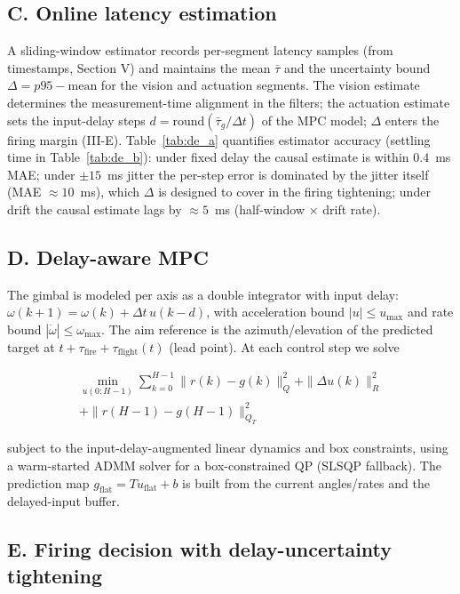 \documentclass[journal]{IEEEtran}
\begin{document}
\subsection*{C. Online latency estimation}

A sliding-window estimator records per-segment latency samples (from timestamps, Section V) and maintains the mean $\bar\tau$ and the uncertainty bound $\Delta = p95 - \mathrm{mean}$ for the vision and actuation segments. The vision estimate determines the measurement-time alignment in the filters; the actuation estimate sets the input-delay steps $d=\mathrm{round}(\bar\tau_g/\Delta t)$ of the MPC model; $\Delta$ enters the firing margin (III-E). Table~\ref{tab:de_a} quantifies estimator accuracy (settling time in Table~\ref{tab:de_b}): under fixed delay the causal estimate is within $0.4$~ms MAE; under $\pm15$~ms jitter the per-step error is dominated by the jitter itself (MAE $\approx10$~ms), which $\Delta$ is designed to cover in the firing tightening; under drift the causal estimate lags by $\approx5$~ms (half-window $\times$ drift rate).

\subsection*{D. Delay-aware MPC}

The gimbal is modeled per axis as a double integrator with input delay: $\omega(k+1)=\omega(k)+\Delta t\, u(k-d)$, with acceleration bound $|u|\le u_{\max}$ and rate bound $|\dot\omega|\le \omega_{\max}$. The aim reference is the azimuth/elevation of the predicted target at $t+\tau_{\mathrm{fire}}+\tau_{\mathrm{flight}}(t)$ (lead point). At each control step we solve

\begin{multline*}
\min_{u(0:H-1)} \sum_{k=0}^{H-1} \|r(k)-g(k)\|_Q^2 + \|\Delta u(k)\|_R^2 \\
+ \|r(H-1)-g(H-1)\|_{Q_T}^2
\end{multline*}

subject to the input-delay-augmented linear dynamics and box constraints, using a warm-started ADMM solver for a box-constrained QP (SLSQP fallback). The prediction map $g_{\mathrm{flat}}=T u_{\mathrm{flat}}+b$ is built from the current angles/rates and the delayed-input buffer.

\subsection*{E. Firing decision with delay-uncertainty tightening}
\end{document}
